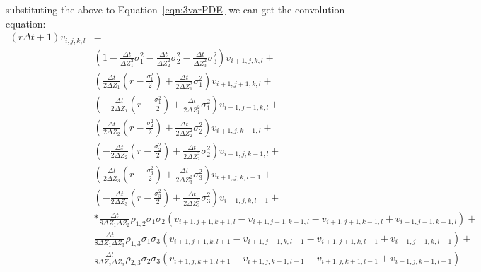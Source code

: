 \documentclass[10pt,a4paper]{article}
\begin{document}
substituting the above to Equation~\ref{eqn:3varPDE} we can get the convolution equation:
\begin{align}
(r\Delta t + 1){v_{i,j,k,l}} &= \\
&(1 - \frac{{\Delta t}}{{\Delta Z_1^2}}\sigma _1^2 - \frac{{\Delta t}}{{\Delta Z_2^2}}\sigma _2^2 - \frac{{\Delta t}}{{\Delta Z_3^2}}\sigma _3^2){v_{i + 1,j,k,l}} + \\
&(\frac{{\Delta t}}{{2\Delta {Z_1}}}(r - \frac{{\sigma _1^2}}{2}) + \frac{{\Delta t}}{{2\Delta Z_1^2}}\sigma _1^2){v_{i + 1,j + 1,k,l}} + \\
&( - \frac{{\Delta t}}{{2\Delta {Z_1}}}(r - \frac{{\sigma _1^2}}{2}) + \frac{{\Delta t}}{{2\Delta Z_1^2}}\sigma _1^2){v_{i + 1,j - 1,k,l}} + \\
&(\frac{{\Delta t}}{{2\Delta {Z_2}}}(r - \frac{{\sigma _2^2}}{2}) +      \frac{{\Delta t}}{{2\Delta Z_2^2}}\sigma _2^2){v_{i + 1,j,k + 1,l}} + \\
&( - \frac{{\Delta t}}{{2\Delta {Z_2}}}(r - \frac{{\sigma _2^2}}{2}) + \frac{{\Delta t}}{{2\Delta Z_2^2}}\sigma _2^2){v_{i + 1,j,k - 1,l}} + \\
&(\frac{{\Delta t}}{{2\Delta {Z_3}}}(r - \frac{{\sigma _3^2}}{2}) + \frac{{\Delta t}}{{2\Delta Z_3^2}}\sigma _3^2){v_{i + 1,j,k,l + 1}} + \\
&( - \frac{{\Delta t}}{{2\Delta {Z_3}}}(r - \frac{{\sigma _3^2}}{2}) + \frac{{\Delta t}}{{2\Delta Z_3^2}}\sigma _3^2){v_{i + 1,j,k,l - 1}} + \\
&*\frac{{\Delta t}}{{8\Delta {Z_1}\Delta {Z_2}}}{\rho _{1,2}}{\sigma _1}{\sigma _2}({v_{i + 1,j + 1,k + 1,l}} - {v_{i + 1,j - 1,k + 1,l}} - {v_{i + 1,j + 1,k - 1,l}} + {v_{i + 1,j - 1,k - 1,l}}) + \\
&\frac{{\Delta t}}{{8\Delta {Z_1}\Delta {Z_3}}}{\rho _{1,3}}{\sigma _1}{\sigma _3}({v_{i + 1,j + 1,k,l + 1}} - {v_{i + 1,j - 1,k,l + 1}} - {v_{i + 1,j + 1,k,l - 1}} + {v_{i + 1,j - 1,k,l - 1}}) + \\
&\frac{{\Delta t}}{{8\Delta {Z_2}\Delta {Z_3}}}{\rho _{2,3}}{\sigma _2}{\sigma _3}({v_{i + 1,j,k + 1,l + 1}} - {v_{i + 1,j,k - 1,l + 1}} - {v_{i + 1,j,k + 1,l - 1}} + {v_{i + 1,j,k - 1,l - 1}})
\end{align}



\end{document}
